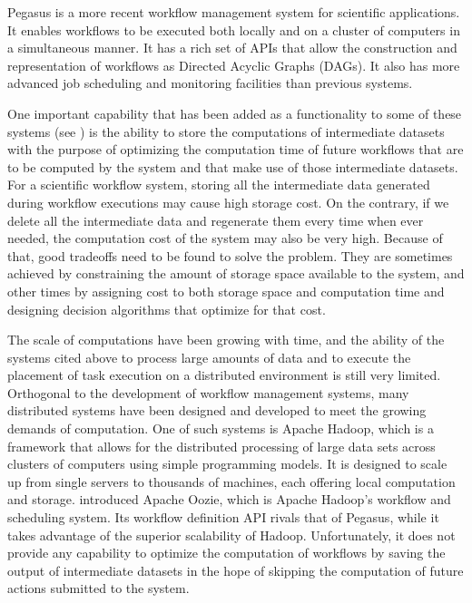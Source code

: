 Pegasus \citep{singh2008workflow} is a more recent workflow management system for scientific applications.  It enables workflows to be executed both locally and on a cluster of computers in a simultaneous manner.  It has a rich set of APIs that allow the construction and representation of workflows as Directed Acyclic Graphs (DAGs).  It also has more advanced job scheduling and monitoring facilities than previous systems.  

One important capability that has been added as a functionality to some of these systems (see \cite{yuan2012data}) is the ability to store the computations of intermediate datasets with the purpose of optimizing the computation time of future workflows that are to be computed by the system and that make use of those intermediate datasets. For a scientific workflow system, storing all the intermediate data generated during workflow executions may cause high storage cost.  On the contrary, if we delete all the intermediate data and regenerate them every time when ever needed, the computation cost of the system may also be very high. Because of that, good tradeoffs need to be found to solve the problem.  They are sometimes achieved by constraining the amount of storage space available to the system, and other times by assigning cost to both storage space and computation time and designing decision algorithms that optimize for that cost. 

The scale of computations have been growing with time, and the ability of the systems cited above to process large amounts of data and to execute the placement of task execution on a distributed environment is still very limited.  Orthogonal to the development of workflow management systems, many distributed systems have been designed and developed to meet the growing demands of computation.  One of such systems is Apache Hadoop, which is a framework that allows for the distributed processing of large data sets across clusters of computers using simple programming models. It is designed to scale up from single servers to thousands of machines, each offering local computation and storage. \cite{islam2012oozie} introduced Apache Oozie, which is Apache Hadoop's workflow and scheduling system.  Its workflow definition API rivals that of Pegasus, while it takes advantage of the superior scalability of Hadoop. Unfortunately, it does not provide any capability to optimize the computation of workflows by saving the output of intermediate datasets in the hope of skipping the computation of future actions submitted to the system.

